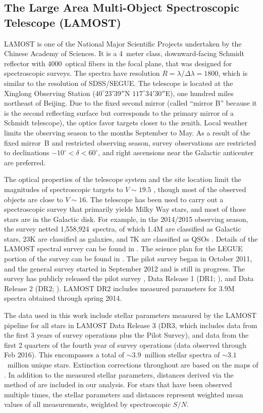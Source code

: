 \documentclass[11pt,preprint]{aastex6}
\begin{document}
\subsection{The Large Area Multi-Object Spectroscopic Telescope (LAMOST)}

LAMOST \citep{Cui2012} is one of the National Major Scientific Projects undertaken by the Chinese Academy of Sciences. It is a 4~meter class, downward-facing Schmidt reflector with 4000~optical fibers in the focal plane, that was designed for spectroscopic surveys.  The spectra have resolution $R = \lambda/\Delta\lambda = 1800$, which is similar to the resolution of SDSS/SEGUE. The telescope is located at the Xinglong Observing Station ($40^\circ23'39''$N $117^\circ34'30''$E), one hundred miles northeast of Beijing.  Due to the fixed second mirror (called ``mirror B'' because it is the second reflecting surface but corresponds to the primary mirror of a Schmidt telescope), the optics favor targets closer to the zenith.  Local weather limits the observing season to the months September to May. As a result of the fixed mirror~B and restricted observing season, survey observations are restricted to declinations $-10^\circ<\delta<60^\circ$, and right ascensions near the Galactic anticenter are preferred. 

The optical properties of the telescope system and the site location limit the magnitudes of spectroscopic targets to $V \sim 19.5$ \citep{Luo2012}, though most of the observed objects are close to $V \sim 16$.  The telescope has been used to carry out a spectroscopic survey \citep{Zhao2012} that primarily yields Milky Way stars, and most of those stars are in the Galactic disk.  For example, in the 2014/2015 observing season, the survey netted 1,558,924~spectra, of which 1.4M are classified as Galactic stars, 23K are classified as galaxies, and 7K are classified as QSOs \citep{He2016}. Details of the LAMOST spectral survey can be found in \citet{Zhao2012}.  The science plan for the LEGUE portion of the survey can be found in \citet{Deng2012}. The pilot survey began in October 2011, and the general survey started in September 2012 and is still in progress.  The survey has publicly released the pilot survey \citep{Luo2012}, Data Release 1 (DR1; \citealt{Luo2015}), and Data Release 2 (DR2; \citealt{Luo2016}).  LAMOST DR2 includes measured parameters for 3.9M spectra obtained through spring 2014.

The data used in this work include stellar parameters measured by the LAMOST pipeline for all stars in LAMOST Data Release 3 (DR3, which includes data from the first 3 years of survey operations plus the Pilot Survey), and data from the first 2 quarters of the fourth year of survey operations (data observed through Feb 2016). This encompasses a total of $\sim3.9$~million stellar spectra of $\sim3.1$~million unique stars. Extinction corrections throughout are based on the maps of \citet{Schlegel1998}. In addition to the measured stellar parameters, distances derived via the method of \citet{Carlin2015} are included in our analysis. For stars that have been observed multiple times, the stellar parameters and distances represent weighted mean values of all measurements, weighted by spectroscopic $S/N$. 
\end{document}

